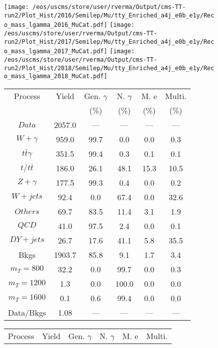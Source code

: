 \begin{figure}
\centering
\texttt{[image: /eos/uscms/store/user/rverma/Output/cms-TT-run2/Plot\_Hist/2016/Semilep/Mu/tty\_Enriched\_a4j\_e0b\_e1y/Reco\_mass\_lgamma\_2016\_MuCat.pdf]}
\texttt{[image: /eos/uscms/store/user/rverma/Output/cms-TT-run2/Plot\_Hist/2017/Semilep/Mu/tty\_Enriched\_a4j\_e0b\_e1y/Reco\_mass\_lgamma\_2017\_MuCat.pdf]}
\texttt{[image: /eos/uscms/store/user/rverma/Output/cms-TT-run2/Plot\_Hist/2018/Semilep/Mu/tty\_Enriched\_a4j\_e0b\_e1y/Reco\_mass\_lgamma\_2018\_MuCat.pdf]}
\begin{minipage}[c]{0.32\textwidth}
\centering
\tiny{
\begin{tabular}{cccccc}
\hline
Process & Yield & Gen. $\gamma$ & N. $\gamma$ & M. e & Multi. \\
 &  & (\%) & (\%) & (\%) & (\%)  \\
\hline
                                                                      $ Data $ &  2057.0 &  --- &  --- &  --- &  ---\\
$ W+\gamma $ &  959.0 &  99.7 &  0.0 &  0.0 &  0.3\\
$ t\bar{t}\gamma $ &  351.5 &  99.4 &  0.3 &  0.1 &  0.1\\
$ t/t\bar{t} $ &  186.0 &  26.1 &  48.1 &  15.3 &  10.5\\
$ Z+\gamma $ &  177.5 &  99.3 &  0.4 &  0.0 &  0.2\\
$ W+jets $ &  92.4 &  0.0 &  67.4 &  0.0 &  32.6\\
$ Others $ &  69.7 &  83.5 &  11.4 &  3.1 &  1.9\\
$ QCD $ &  41.0 &  97.5 &  2.4 &  0.0 &  0.1\\
$ DY+jets $ &  26.7 &  17.6 &  41.1 &  5.8 &  35.5\\
Bkgs &  1903.7 &  85.8 &  9.1 &  1.7 &  3.4\\
$ m_{T} = 800 $ &  32.2 &  0.0 &  99.7 &  0.0 &  0.3\\
$ m_{T} = 1200 $ &  1.3 &  0.0 &  100.0 &  0.0 &  0.0\\
$ m_{T} = 1600 $ &  0.1 &  0.6 &  99.4 &  0.0 &  0.0\\
Data/Bkgs &  1.08 &  --- &  --- &  --- &  ---\\
\hline
\end{tabular}
}
\end{minipage}
\begin{minipage}[c]{0.32\textwidth}
\centering
\tiny{
\begin{tabular}{cccccc}
\hline
Process & Yield & Gen. $\gamma$ & N. $\gamma$ & M. e & Multi. \\

\end{tabular}}
\end{minipage}
\end{figure}
